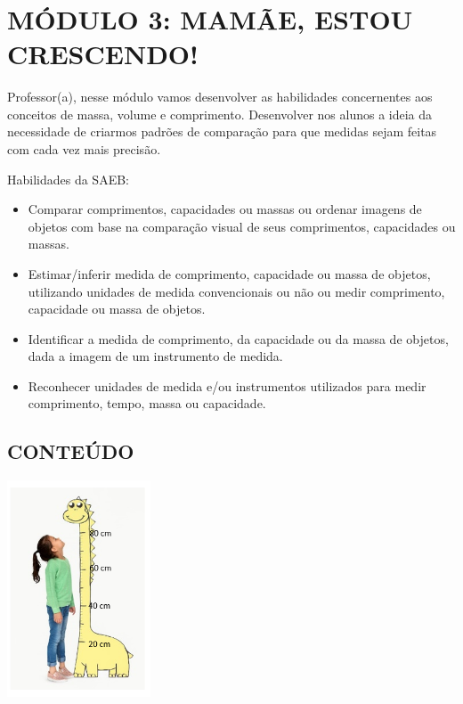 \subsubsection{\texorpdfstring{\\
}{ }}\label{section-26}

\section{MÓDULO 3: MAMÃE, ESTOU
CRESCENDO!}\label{muxf3dulo-3-mamuxe3e-estou-crescendo}

Professor(a), nesse módulo vamos desenvolver as habilidades concernentes
aos conceitos de massa, volume e comprimento. Desenvolver nos alunos a
ideia da necessidade de criarmos padrões de comparação para que medidas
sejam feitas com cada vez mais precisão.

Habilidades da SAEB:

\begin{itemize}
\item
  Comparar comprimentos, capacidades ou massas ou ordenar imagens de
  objetos com base na comparação visual de seus comprimentos,
  capacidades ou massas.
\item
  Estimar/inferir medida de comprimento, capacidade ou massa de objetos,
  utilizando unidades de medida convencionais ou não ou medir
  comprimento, capacidade ou massa de objetos.
\item
  Identificar a medida de comprimento, da capacidade ou da massa de
  objetos, dada a imagem de um instrumento de medida.
\item
  Reconhecer unidades de medida e/ou instrumentos utilizados para medir
  comprimento, tempo, massa ou capacidade.
\end{itemize}

\subsection{CONTEÚDO}\label{conteuxfado-2}

\includegraphics[width=1.67708in,height=2.53098in]{media/image21.png}

